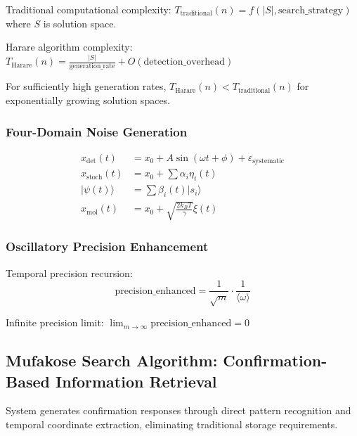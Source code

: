 ﻿\documentclass[11pt,a4paper]{article}
\begin{document}
Traditional computational complexity: $T_{\text{traditional}}(n) = f(|S|, \text{search\_strategy})$ where $S$ is solution space.

Harare algorithm complexity: $T_{\text{Harare}}(n) = \frac{|S|}{\text{generation\_rate}} + O(\text{detection\_overhead})$

\begin{theorem}
For sufficiently high generation rates, $T_{\text{Harare}}(n) < T_{\text{traditional}}(n)$ for exponentially growing solution spaces.
\end{theorem}

\subsubsection{Four-Domain Noise Generation}

\begin{align}
x_{\text{det}}(t) &= x_0 + A \sin(\omega t + \phi) + \varepsilon_{\text{systematic}} \\
x_{\text{stoch}}(t) &= x_0 + \sum \alpha_i \eta_i(t) \\
|\psi(t)\rangle &= \sum \beta_i(t) |s_i\rangle \\
x_{\text{mol}}(t) &= x_0 + \sqrt{\frac{2k_B T}{\gamma}} \xi(t)
\end{align}

\subsubsection{Oscillatory Precision Enhancement}

Temporal precision recursion:
\begin{equation}
\text{precision\_enhanced} = \frac{1}{\sqrt{m}} \cdot \frac{1}{\langle\omega\rangle}
\end{equation}

Infinite precision limit: $\lim_{m \rightarrow \infty} \text{precision\_enhanced} = 0$

\subsection{Mufakose Search Algorithm: Confirmation-Based Information Retrieval}

\begin{theorem}
System generates confirmation responses through direct pattern recognition and temporal coordinate extraction, eliminating traditional storage requirements.
\end{theorem}
\end{document}

